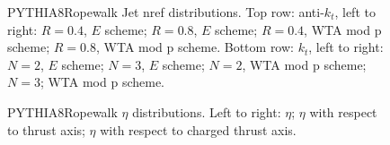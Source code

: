 \begin{figure}[H]
\hfill
{}\hfill
\caption{PYTHIA8Ropewalk Jet nref distributions. Top row: anti-$k_t$, left to right: $R=0.4$, $E$ scheme; $R=0.8$, $E$ scheme; $R=0.4$, WTA mod p scheme; $R=0.8$, WTA mod p scheme. Bottom row: $k_t$, left to right: $N=2$, $E$ scheme; $N=3$, $E$ scheme; $N=2$, WTA mod p scheme; $N=3$; WTA mod p scheme.}  
\end{figure}

\begin{figure}[H]
\centering
{}\hfill
{}\hfill
{}\hfill
\caption{PYTHIA8Ropewalk $\eta$ distributions. Left to right: $\eta$; $\eta$ with respect to thrust axis; $\eta$ with respect to charged thrust axis.}
\end{figure}

